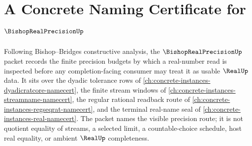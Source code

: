 \chapter{A Concrete Naming Certificate for $\BishopRealPrecisionUp$}
\label{ch:concrete-instances-bishop-real-precision-namecert}

Following Bishop--Bridges constructive analysis, the $\BishopRealPrecisionUp$ packet records the finite precision budgets by which a real-number read is inspected before any completion-facing consumer may treat it as usable $\RealUp$ data. It sits over the dyadic tolerance rows of \autoref{ch:concrete-instances-dyadicratcore-namecert}, the finite stream windows of \autoref{ch:concrete-instances-streamname-namecert}, the regular rational readback route of \autoref{ch:concrete-instances-regseqrat-namecert}, and the terminal real-name seal of \autoref{ch:concrete-instances-real-namecert}. The packet names the visible precision route; it is not quotient equality of streams, a selected limit, a countable-choice schedule, host real equality, or ambient $\RealUp$ completeness.

